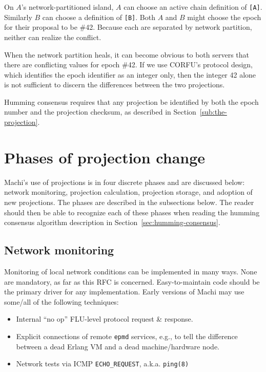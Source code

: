 \documentclass[preprint,10pt]{sigplanconf}
\begin{document}
On $A$'s network-partitioned island, $A$ can choose
an active chain definition of {\tt [A]}.
Similarly $B$ can choose a definition of {\tt [B]}.  Both $A$ and $B$
might choose the
epoch for their proposal to be \#42.  Because each are separated by
network partition, neither can realize the conflict.

When the network partition heals, it can become obvious to both
servers that there are conflicting values for epoch \#42.  If we
use CORFU's protocol design, which identifies the epoch identifier as
an integer only, then the integer 42 alone is not sufficient to
discern the differences between the two projections.

Humming consensus requires that any projection be identified by both
the epoch number and the projection checksum, as described in
Section~\ref{sub:the-projection}.

\section{Phases of projection change}
\label{sec:phases-of-projection-change}

Machi's use of projections is in four discrete phases and are
discussed below: network monitoring,
projection calculation, projection storage, and
adoption of new projections.  The phases are described in the
subsections below.  The reader should then be able to recognize each
of these phases when reading the humming consensus algorithm
description in Section~\ref{sec:humming-consensus}.

\subsection{Network monitoring}
\label{sub:network-monitoring}

Monitoring of local network conditions can be implemented in many
ways.  None are mandatory, as far as this RFC is concerned.
Easy-to-maintain code should be the primary driver for any
implementation.  Early versions of Machi may use some/all of the
following techniques:

\begin{itemize}
\item Internal ``no op'' FLU-level protocol request \& response.
\item Explicit connections of remote {\tt epmd} services, e.g., to
tell the difference between a dead Erlang VM and a dead
machine/hardware node.
\item Network tests via ICMP {\tt ECHO\_REQUEST}, a.k.a. {\tt ping(8)}
\end{itemize}
\end{document}
